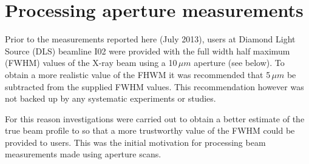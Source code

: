 \section{Processing aperture measurements}
\label{sec:Processing aperture measurements}
Prior to the measurements reported here (July 2013), users at Diamond Light Source (DLS) beamline I02 were provided with the full width half maximum (FWHM) values of the X-ray beam using a 10$\,\mu m$ aperture (see below).
To obtain a more realistic value of the FHWM it was recommended that 5$\,\mu m$ be subtracted from the supplied FWHM values.
This recommendation however was not backed up by any systematic experiments or studies.

For this reason investigations were carried out to obtain a better estimate of the true beam profile to so that a more trustworthy value of the FWHM could be provided to users.
This was the initial motivation for processing beam measurements made using aperture scans.

